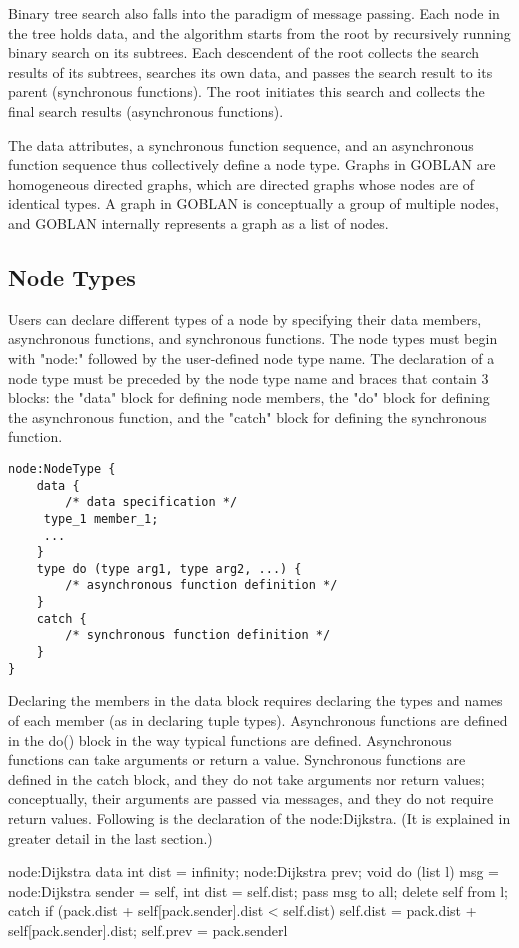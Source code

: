 \documentclass{article}
\begin{document}
Binary tree search also falls into the paradigm of message passing. Each node in the tree holds data, and the algorithm starts from the root by recursively running binary search on its subtrees. Each descendent of the root collects the search results of its subtrees, searches its own data, and passes the search result to its parent (synchronous functions). The root initiates this search and collects the final search results (asynchronous functions).

The data attributes, a synchronous function sequence, and an asynchronous function sequence thus collectively define a node type. Graphs in GOBLAN are homogeneous directed graphs, which are directed graphs whose nodes are of identical types. A graph in GOBLAN is conceptually a group of multiple nodes, and GOBLAN internally represents a graph as a list of nodes.
\subsection{Node Types}
Users can declare different types of a node by specifying their data members,
asynchronous functions, and synchronous functions. The node types must begin
with "node:" %
followed by the user-defined node type name. The declaration of a node type must be preceded by the node type name and braces that contain 3 blocks: the "data" block for defining node members, the "do" block for defining the asynchronous function, and the "catch" block for defining the synchronous function.

\begin{lstlisting}
node:NodeType {
	data {
    	/* data specification */
   	 type_1 member_1;
   	 ...
	}
	type do (type arg1, type arg2, ...) {
    	/* asynchronous function definition */
	}
	catch {
    	/* synchronous function definition */
	}
}
\end{lstlisting}
Declaring the members in the data{} block requires declaring the types and names of each member (as in declaring tuple types). Asynchronous functions are defined in the do(){} block in the way typical functions are defined. Asynchronous functions can take arguments or return a value. Synchronous functions are defined in the catch{} block, and they do not take arguments nor return values; conceptually, their arguments are passed via messages, and they do not require return values. Following is the declaration of the node:Dijkstra. (It is explained in greater detail in the last section.)

node:Dijkstra{
    data{
	 int dist = infinity;
   	 node:Dijkstra prev;
    }
    void do (list l){
   	 msg = {node:Dijkstra sender = self,
   			 int dist = self.dist};
   	 pass msg to all;
   	 delete self from l;
    }
    catch{
   	 if (pack.dist + self[pack.sender].dist < self.dist){
   		 self.dist = pack.dist + self[pack.sender].dist;
   		 self.prev = pack.senderl
   	 }
    }
}
\end{document}
